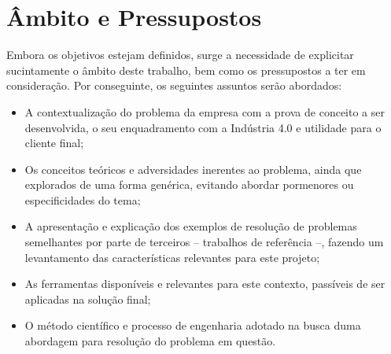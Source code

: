 
\section{Âmbito e Pressupostos}
\label{sec:chap01_scope}
Embora os objetivos estejam definidos, surge a necessidade de explicitar sucintamente o âmbito deste trabalho, bem como os pressupostos a ter em consideração. Por conseguinte, os seguintes assuntos serão abordados:

\begin{itemize}
    \item
    {
        A contextualização do problema da empresa com a prova de conceito a ser desenvolvida, o seu enquadramento com a Indústria 4.0 e utilidade para o cliente final; 
    }
    \item 
    {
        Os conceitos teóricos e adversidades inerentes ao problema, ainda que explorados de uma forma genérica, evitando abordar pormenores ou especificidades do tema;
    }
    \item
    {
        A apresentação e explicação dos exemplos de resolução de problemas semelhantes por parte de terceiros -- trabalhos de referência --, fazendo um levantamento das características relevantes para este projeto;
    }
    \item
    {
        As ferramentas disponíveis e relevantes para este contexto, passíveis de ser aplicadas na solução final;
    }
    \item
    {
        O método científico e processo de engenharia adotado na busca duma abordagem para resolução do problema em questão.
    }
\end{itemize}

